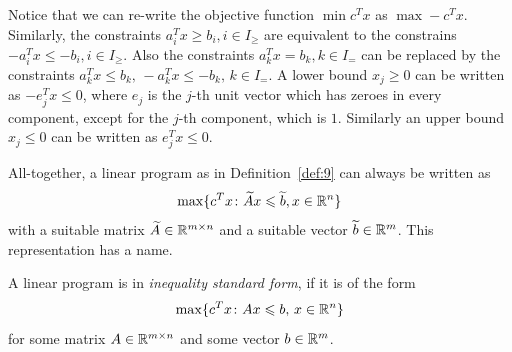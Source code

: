   Notice that we can re-write the objective function $\min c^Tx$ as
  $\max -c^Tx $. Similarly, the  constraints
  $a_i^T x \geq b_i, i \in {I_\geq} $ are equivalent to the constrains 
  $-a_i^T x \leq -b_i, i \in {I_\geq}$. Also the constraints  $ a_k^T x =
  b_k, k \in {I_=}$ can be replaced by the constraints  $a_k^T x \leq
  b_k,\, -a_k^T x \leq  -b_k,\,   k \in {I_=}$. 
  A  lower bound $x_j \geq0$ can be written as $-e_j^Tx\leq0$, where $e_j$ is
  the $j$-th unit vector which has zeroes in every component, except
  for the $j$-th component, which is $1$. Similarly an upper bound
  $x_j\leq0$ can be written as $e_j^Tx\leq0$. 

  All-together, a linear program as in Definition~\ref{def:9}  can
  always be written as 
  $$\max\{c^Tx\colon \widetilde{A}x\leqslant \widetilde{b}, x\in \mathbb{R}^n\}$$ with a suitable matrix
  $\widetilde{A} \in \mathbb{R}^{m\times n}$ and a   suitable vector $\widetilde{b}\in \mathbb{R}^m$. This
  representation has a name. 



\begin{definition}
  \label{def:11}
  A linear program is in \emph{inequality standard form}, if it is of
  the form
  \begin{displaymath}
    \max \{c^Tx \colon Ax\leqslant b, \, x \in \mathbb{R}^n\}
  \end{displaymath}
  for some matrix $A\in \mathbb{R}^{m\times n}$ and some vector $b \in \mathbb{R}^m$. 
\end{definition}


